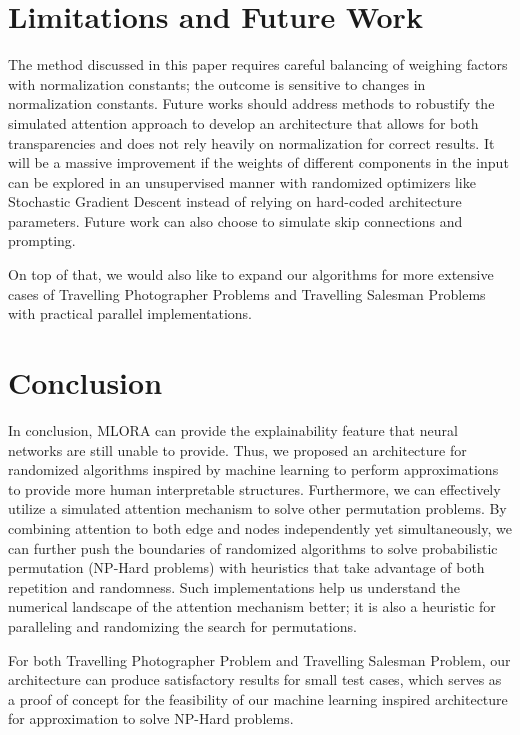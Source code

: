 \documentclass[10pt, conference, compsocconf]{IEEEtran}
\begin{document}
\section{Limitations and Future Work}
The method discussed in this paper requires careful balancing of weighing factors with normalization constants; the outcome is sensitive to changes in normalization constants. Future works should address methods to robustify the simulated attention approach to develop an architecture that allows for both transparencies and does not rely heavily on normalization for correct results. It will be a massive improvement if the weights of different components in the input can be explored in an unsupervised manner with randomized optimizers like Stochastic Gradient Descent instead of relying on hard-coded architecture parameters. Future work can also choose to simulate skip connections and prompting. 

On top of that, we would also like to expand our algorithms for more extensive cases of Travelling Photographer Problems and Travelling Salesman Problems with practical parallel implementations. 

\section{Conclusion}
In conclusion,  MLORA can provide the explainability feature that neural networks are still unable to provide. Thus, we proposed an architecture for randomized algorithms inspired by machine learning to perform approximations to provide more human interpretable structures. Furthermore, we can effectively utilize a simulated attention mechanism to solve other permutation problems. By combining attention to both edge and nodes independently yet simultaneously, we can further push the boundaries of randomized algorithms to solve probabilistic permutation (NP-Hard problems) with heuristics that take advantage of both repetition and randomness. Such implementations help us understand the numerical landscape of the attention mechanism better; it is also a heuristic for paralleling and randomizing the search for permutations. 

For both Travelling Photographer Problem and Travelling Salesman Problem, our architecture can produce satisfactory results for small test cases, which serves as a proof of concept for the feasibility of our machine learning inspired architecture for approximation to solve NP-Hard problems.
\end{document}

